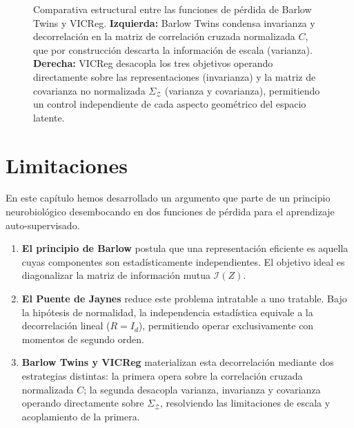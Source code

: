 \begin{figure}[H]
{
}
\caption{Comparativa estructural entre las funciones de p\'erdida de Barlow Twins y VICReg. \textbf{Izquierda:} Barlow Twins condensa invarianza y decorrelaci\'on en la matriz de correlaci\'on cruzada normalizada $C$, que por construcci\'on descarta la informaci\'on de escala (varianza). \textbf{Derecha:} VICReg desacopla los tres objetivos operando directamente sobre las representaciones (invarianza) y la matriz de covarianza no normalizada $\Sigma_\mathcal{Z}$ (varianza y covarianza), permitiendo un control independiente de cada aspecto geom\'etrico del espacio latente.}
\label{fig:bt_vs_vicreg}
\end{figure}

\section{Limitaciones}
\label{sec:conclusiones_barlow}

En este capítulo hemos desarrollado un argumento que parte de un principio neurobiológico desembocando en dos funciones de pérdida para el aprendizaje auto-supervisado.

\begin{enumerate}
    \item \textbf{El principio de Barlow}  postula que una representación eficiente es aquella cuyas componentes son estadísticamente independientes. El objetivo ideal es diagonalizar la matriz de información mutua $\mathcal{I}(Z)$.
    
    \item \textbf{El Puente de Jaynes} reduce este problema intratable a uno tratable. Bajo la hipótesis de normalidad, la independencia estadística equivale a la decorrelación lineal ($R = I_d$), permitiendo operar exclusivamente con momentos de segundo orden.
    
    \item \textbf{Barlow Twins y VICReg} materializan esta decorrelación mediante dos estrategias distintas: la primera opera sobre la correlación cruzada normalizada $C$; la segunda desacopla varianza, invarianza y covarianza operando directamente sobre $\Sigma_\mathcal{Z}$, resolviendo las limitaciones de escala y acoplamiento de la primera.
\end{enumerate}

